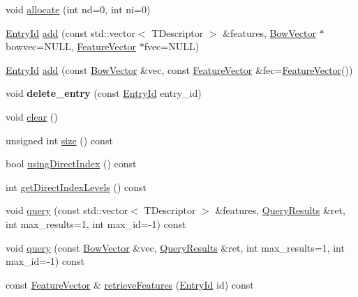 \begin{DoxyCompactItemize}
\item 
void \hyperlink{classDBoW2_1_1TemplatedDatabase_a5b410217ede05dc0920e2adc1e20b4b5}{allocate} (int nd=0, int ni=0)
\item 
\hyperlink{namespaceDBoW2_a060a36cf320e6e831ee98915c19c1623}{Entry\+Id} \hyperlink{classDBoW2_1_1TemplatedDatabase_a7a3af9e631370017d1e54da43d9b790b}{add} (const std\+::vector$<$ T\+Descriptor $>$ \&features, \hyperlink{classDBoW2_1_1BowVector}{Bow\+Vector} $\ast$bowvec=N\+U\+LL, \hyperlink{classDBoW2_1_1FeatureVector}{Feature\+Vector} $\ast$fvec=N\+U\+LL)
\item 
\hyperlink{namespaceDBoW2_a060a36cf320e6e831ee98915c19c1623}{Entry\+Id} \hyperlink{classDBoW2_1_1TemplatedDatabase_aa4e2521632542181e40930faffc8fee9}{add} (const \hyperlink{classDBoW2_1_1BowVector}{Bow\+Vector} \&vec, const \hyperlink{classDBoW2_1_1FeatureVector}{Feature\+Vector} \&fec=\hyperlink{classDBoW2_1_1FeatureVector}{Feature\+Vector}())
\item 
\mbox{\label{classDBoW2_1_1TemplatedDatabase_a26de02af2eef17aab551cc05a61e4c96}} 
void {\bfseries delete\+\_\+entry} (const \hyperlink{namespaceDBoW2_a060a36cf320e6e831ee98915c19c1623}{Entry\+Id} entry\+\_\+id)
\item 
void \hyperlink{classDBoW2_1_1TemplatedDatabase_a88fe9b880f9b753de1ea6e07fe42808b}{clear} ()
\item 
unsigned int \hyperlink{classDBoW2_1_1TemplatedDatabase_a5c30e54458f694aef1941a0dec193d4d}{size} () const
\item 
bool \hyperlink{classDBoW2_1_1TemplatedDatabase_ad0fbf387b5707d6da34f0df05dc87401}{using\+Direct\+Index} () const
\item 
int \hyperlink{classDBoW2_1_1TemplatedDatabase_af1fd1540b9e81fae498d41b87050efb0}{get\+Direct\+Index\+Levels} () const
\item 
void \hyperlink{classDBoW2_1_1TemplatedDatabase_aea53ba2ef3cbfe8fa9eaaa8152e16c85}{query} (const std\+::vector$<$ T\+Descriptor $>$ \&features, \hyperlink{classDBoW2_1_1QueryResults}{Query\+Results} \&ret, int max\+\_\+results=1, int max\+\_\+id=-\/1) const
\item 
void \hyperlink{classDBoW2_1_1TemplatedDatabase_a27b2365cd82bf44bd41c20bc37d698ec}{query} (const \hyperlink{classDBoW2_1_1BowVector}{Bow\+Vector} \&vec, \hyperlink{classDBoW2_1_1QueryResults}{Query\+Results} \&ret, int max\+\_\+results=1, int max\+\_\+id=-\/1) const
\item 
const \hyperlink{classDBoW2_1_1FeatureVector}{Feature\+Vector} \& \hyperlink{classDBoW2_1_1TemplatedDatabase_ac6501f207868c7466322827a59c6eb3e}{retrieve\+Features} (\hyperlink{namespaceDBoW2_a060a36cf320e6e831ee98915c19c1623}{Entry\+Id} id) const

\end{DoxyCompactItemize}
